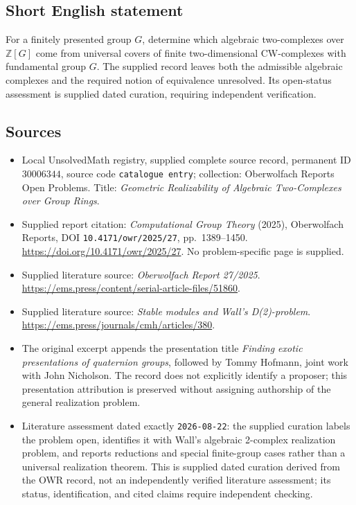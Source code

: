 \documentclass[11pt]{article}
\newcommand{\Z}{\mathbb{Z}}
\begin{document}
\subsection{Short English statement}
For a finitely presented group \(G\), determine which algebraic two-complexes over \(\Z[G]\) come from universal covers of finite two-dimensional CW-complexes with fundamental group \(G\). The supplied record leaves both the admissible algebraic complexes and the required notion of equivalence unresolved. Its open-status assessment is supplied dated curation, requiring independent verification.
\subsection{Sources}
\begin{itemize}
\item Local UnsolvedMath registry, supplied complete source record, permanent ID \(30006344\), source code \texttt{catalogue entry}; collection: Oberwolfach Reports Open Problems. Title: \emph{Geometric Realizability of Algebraic Two-Complexes over Group Rings}.
\item Supplied report citation: \emph{Computational Group Theory} (2025), Oberwolfach Reports, DOI \texttt{10.4171/owr/2025/27}, pp.\ 1389--1450. \url{https://doi.org/10.4171/owr/2025/27}. No problem-specific page is supplied.
\item Supplied literature source: \emph{Oberwolfach Report 27/2025}. \url{https://ems.press/content/serial-article-files/51860}.
\item Supplied literature source: \emph{Stable modules and Wall's D(2)-problem}. \url{https://ems.press/journals/cmh/articles/380}.
\item The original excerpt appends the presentation title \emph{Finding exotic presentations of quaternion groups}, followed by Tommy Hofmann, joint work with John Nicholson. The record does not explicitly identify a proposer; this presentation attribution is preserved without assigning authorship of the general realization problem.
\item Literature assessment dated exactly \texttt{2026-08-22}: the supplied curation labels the problem open, identifies it with Wall's algebraic 2-complex realization problem, and reports reductions and special finite-group cases rather than a universal realization theorem. This is supplied dated curation derived from the OWR record, not an independently verified literature assessment; its status, identification, and cited claims require independent checking.
\end{itemize}
\end{document}
